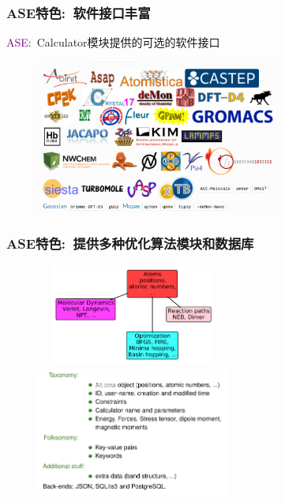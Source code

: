 \frame
{
\frametitle{\textrm{ASE}特色:~软件接口丰富}
\textcolor{purple}{\textrm{ASE}}:~\textrm{Calculator}模块提供的可选的软件接口
\begin{figure}[h!]
\centering
\vspace*{-0.05in}
\includegraphics[height=2.0in,width=3.2in,viewport=0 0 940 600,clip]{Figures/ASE_calculator-new.png}
\caption{\fontsize{7.2pt}{4.2pt}}%
\label{ASE_Calculator}
\end{figure} 
}

\frame
{
\frametitle{\textrm{ASE}特色:~提供多种优化算法模块和数据库}
\begin{figure}[h!]
\centering
\vspace*{-0.18in}
\includegraphics[height=1.3in,width=2.5in,viewport=0 0 838 500,clip]{Figures/ASE_opt_modules.png}
\vskip 1pt
\includegraphics[height=1.7in,width=2.5in,viewport=0 0 938 630,clip]{Figures/ASE_database.png}
\label{ASE_opt-database}
\end{figure} 
}

